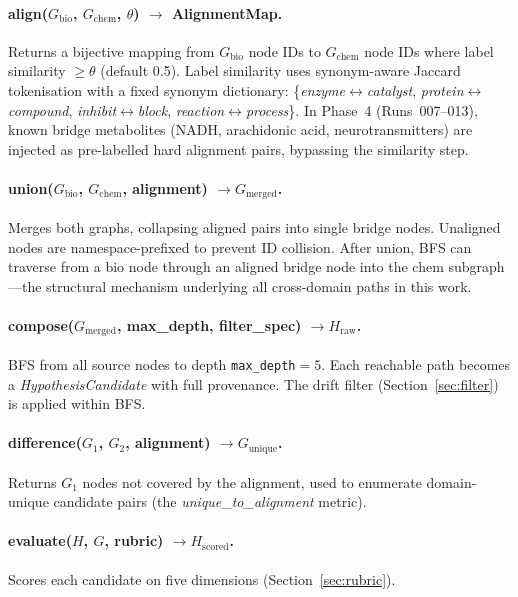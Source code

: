 \paragraph{align($G_{\text{bio}}$, $G_{\text{chem}}$, $\theta$) $\to$ AlignmentMap.}
Returns a bijective mapping from $G_{\text{bio}}$ node IDs to $G_{\text{chem}}$ node
IDs where label similarity $\geq \theta$ (default 0.5).
Label similarity uses synonym-aware Jaccard tokenisation with a fixed synonym dictionary:
\{\textit{enzyme}$\leftrightarrow$\textit{catalyst},
  \textit{protein}$\leftrightarrow$\textit{compound},
  \textit{inhibit}$\leftrightarrow$\textit{block},
  \textit{reaction}$\leftrightarrow$\textit{process}\}.
In Phase~4 (Runs~007--013), known bridge metabolites (NADH, arachidonic acid,
neurotransmitters) are injected as pre-labelled hard alignment pairs, bypassing the
similarity step.

\paragraph{union($G_{\text{bio}}$, $G_{\text{chem}}$, alignment) $\to G_{\text{merged}}$.}
Merges both graphs, collapsing aligned pairs into single bridge nodes.
Unaligned nodes are namespace-prefixed to prevent ID collision.
After union, BFS can traverse from a bio node through an aligned bridge node
into the chem subgraph---the structural mechanism underlying all cross-domain
paths in this work.

\paragraph{compose($G_{\text{merged}}$, max\_depth, filter\_spec) $\to H_{\text{raw}}$.}
BFS from all source nodes to depth \texttt{max\_depth}$=5$.
Each reachable path becomes a \textit{HypothesisCandidate} with full provenance.
The drift filter (Section~\ref{sec:filter}) is applied within BFS.

\paragraph{difference($G_1$, $G_2$, alignment) $\to G_{\text{unique}}$.}
Returns $G_1$ nodes not covered by the alignment, used to enumerate domain-unique
candidate pairs (the \textit{unique\_to\_alignment} metric).

\paragraph{evaluate($H$, $G$, rubric) $\to H_{\text{scored}}$.}
Scores each candidate on five dimensions (Section~\ref{sec:rubric}).

